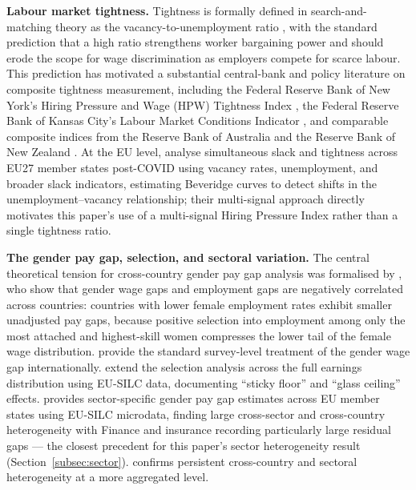 \documentclass[12pt,a4paper]{article}
\begin{document}
\medskip
\noindent\textbf{Labour market tightness.}  Tightness is formally defined in
search-and-matching theory as the vacancy-to-unemployment ratio
\citep{MortensenPissarides1994}, with the standard prediction that a high ratio
strengthens worker bargaining power and should erode the scope for wage
discrimination as employers compete for scarce labour.  This prediction has
motivated a substantial central-bank and policy literature on composite tightness
measurement, including the Federal Reserve Bank of New York's Hiring Pressure and
Wage (HPW) Tightness Index \citep{HeisePearceWeber2024}, the Federal Reserve
Bank of Kansas City's Labour Market Conditions Indicator
\citep{HakkioWillis2014}, and comparable composite indices from the Reserve Bank
of Australia \citep{BakerBall2018} and the Reserve Bank of New Zealand
\citep{ArmstrongKamberKaragedikli2016}.  At the EU level,
\citet{KissEtAl2022} analyse simultaneous slack and tightness across EU27 member
states post-COVID using vacancy rates, unemployment, and broader slack
indicators, estimating Beveridge curves to detect shifts in the
unemployment--vacancy relationship; their multi-signal approach directly motivates
this paper's use of a multi-signal Hiring Pressure Index rather than a single
tightness ratio.

\medskip
\noindent\textbf{The gender pay gap, selection, and sectoral variation.}  The
central theoretical tension for cross-country gender pay gap analysis was
formalised by \citet{OlivettiPetrongolo2008}, who show that gender wage gaps and
employment gaps are negatively correlated across countries: countries with lower
female employment rates exhibit smaller unadjusted pay gaps, because positive
selection into employment among only the most attached and highest-skill women
compresses the lower tail of the female wage distribution.
\citet{BlauKahn2017} provide the standard survey-level treatment of the gender
wage gap internationally.  \citet{ChristofidesPolycarpouVrachimis2013} extend
the selection analysis across the full earnings distribution using EU-SILC data,
documenting ``sticky floor'' and ``glass ceiling'' effects.
\citet{Hedija2017} provides sector-specific gender pay gap estimates across EU
member states using EU-SILC microdata, finding large cross-sector and
cross-country heterogeneity with Finance and insurance recording particularly
large residual gaps --- the closest precedent for this paper's sector
heterogeneity result (Section~\ref{subsec:sector}).
\citet{Bacovic2022} confirms persistent cross-country and sectoral heterogeneity
at a more aggregated level.
\end{document}

